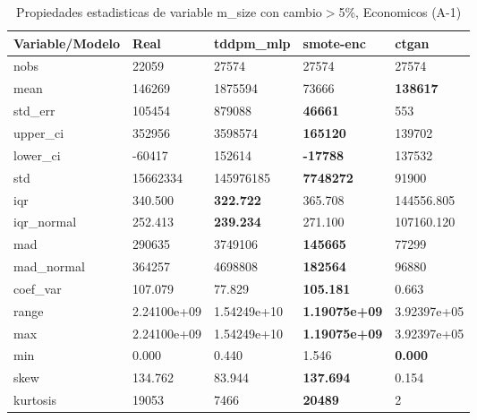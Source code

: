 \begin{table}[H]
\centering
\fontsize{8}{14}\selectfont
\caption{Propiedades estadisticas de variable m\_size con cambio\ensuremath{>}5\%, Economicos (A-1)}
\label{table-stats-economicos-a-1-m_size-short}
\begin{tabular}{|l|m{10em}|m{10em}|m{10em}|m{10em}|}
\hline
 \rowcolor[gray]{0.8}
Variable/Modelo & Real & tddpm\_mlp & smote-enc & ctgan \\
\hline nobs & 22059 & 27574 & 27574 & 27574 \\
\hline mean & 146269 & \cellcolor[rgb]{0.9, 0.54, 0.52} 1875594 & 73666 & \bfseries 138617 \\
\hline std\_err & 105454 & \cellcolor[rgb]{0.9, 0.54, 0.52} 879088 & \bfseries 46661 & 553 \\
\hline upper\_ci & 352956 & \cellcolor[rgb]{0.9, 0.54, 0.52} 3598574 & \bfseries 165120 & 139702 \\
\hline lower\_ci & -60417 & \cellcolor[rgb]{0.9, 0.54, 0.52} 152614 & \bfseries -17788 & 137532 \\
\hline std & 15662334 & \cellcolor[rgb]{0.9, 0.54, 0.52} 145976185 & \bfseries 7748272 & 91900 \\
\hline iqr & 340.500 & \bfseries 322.722 & 365.708 & \cellcolor[rgb]{0.9, 0.54, 0.52} 144556.805 \\
\hline iqr\_normal & 252.413 & \bfseries 239.234 & 271.100 & \cellcolor[rgb]{0.9, 0.54, 0.52} 107160.120 \\
\hline mad & 290635 & \cellcolor[rgb]{0.9, 0.54, 0.52} 3749106 & \bfseries 145665 & 77299 \\
\hline mad\_normal & 364257 & \cellcolor[rgb]{0.9, 0.54, 0.52} 4698808 & \bfseries 182564 & 96880 \\
\hline coef\_var & 107.079 & 77.829 & \bfseries 105.181 & \cellcolor[rgb]{0.9, 0.54, 0.52} 0.663 \\
\hline range & 2.24100e+09 & \cellcolor[rgb]{0.9, 0.54, 0.52} 1.54249e+10 & \bfseries 1.19075e+09 & 3.92397e+05 \\
\hline max & 2.24100e+09 & \cellcolor[rgb]{0.9, 0.54, 0.52} 1.54249e+10 & \bfseries 1.19075e+09 & 3.92397e+05 \\
\hline min & 0.000 & 0.440 & \cellcolor[rgb]{0.9, 0.54, 0.52} 1.546 & \bfseries 0.000 \\
\hline skew & 134.762 & 83.944 & \bfseries 137.694 & \cellcolor[rgb]{0.9, 0.54, 0.52} 0.154 \\
\hline kurtosis & 19053 & 7466 & \bfseries 20489 & \cellcolor[rgb]{0.9, 0.54, 0.52} 2 \\

\end{tabular}
\end{table}
